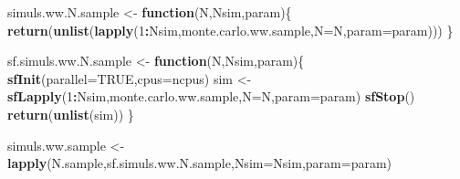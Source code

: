 \documentclass[]{book}
\newenvironment{Shaded}{\begin{snugshade}}{\end{snugshade}}
\newcommand{\KeywordTok}[1]{\textcolor[rgb]{0.13,0.29,0.53}{\textbf{#1}}}
\newcommand{\DataTypeTok}[1]{\textcolor[rgb]{0.13,0.29,0.53}{#1}}
\newcommand{\DecValTok}[1]{\textcolor[rgb]{0.00,0.00,0.81}{#1}}
\newcommand{\StringTok}[1]{\textcolor[rgb]{0.31,0.60,0.02}{#1}}
\newcommand{\OtherTok}[1]{\textcolor[rgb]{0.56,0.35,0.01}{#1}}
\newcommand{\ControlFlowTok}[1]{\textcolor[rgb]{0.13,0.29,0.53}{\textbf{#1}}}
\newcommand{\OperatorTok}[1]{\textcolor[rgb]{0.81,0.36,0.00}{\textbf{#1}}}
\newcommand{\NormalTok}[1]{#1}
\theoremstyle{definition}
\theoremstyle{definition}
\theoremstyle{definition}
\theoremstyle{remark}
\begin{document}
\begin{Shaded}
\begin{Highlighting}[]
\NormalTok{simuls.ww.N.sample <-}\StringTok{ }\ControlFlowTok{function}\NormalTok{(N,Nsim,param)\{}
  \KeywordTok{return}\NormalTok{(}\KeywordTok{unlist}\NormalTok{(}\KeywordTok{lapply}\NormalTok{(}\DecValTok{1}\OperatorTok{:}\NormalTok{Nsim,monte.carlo.ww.sample,}\DataTypeTok{N=}\NormalTok{N,}\DataTypeTok{param=}\NormalTok{param)))}
\NormalTok{\}}

\NormalTok{sf.simuls.ww.N.sample <-}\StringTok{ }\ControlFlowTok{function}\NormalTok{(N,Nsim,param)\{}
  \KeywordTok{sfInit}\NormalTok{(}\DataTypeTok{parallel=}\OtherTok{TRUE}\NormalTok{,}\DataTypeTok{cpus=}\NormalTok{ncpus)}
\NormalTok{  sim <-}\StringTok{ }\KeywordTok{sfLapply}\NormalTok{(}\DecValTok{1}\OperatorTok{:}\NormalTok{Nsim,monte.carlo.ww.sample,}\DataTypeTok{N=}\NormalTok{N,}\DataTypeTok{param=}\NormalTok{param)}
  \KeywordTok{sfStop}\NormalTok{()}
  \KeywordTok{return}\NormalTok{(}\KeywordTok{unlist}\NormalTok{(sim))}
\NormalTok{\}}

\NormalTok{simuls.ww.sample <-}\StringTok{ }\KeywordTok{lapply}\NormalTok{(N.sample,sf.simuls.ww.N.sample,}\DataTypeTok{Nsim=}\NormalTok{Nsim,}\DataTypeTok{param=}\NormalTok{param)}


\end{Highlighting}
\end{Shaded}
\end{document}
